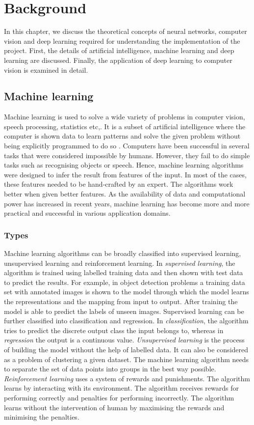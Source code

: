 \documentclass[a4paper, 12pt, oneside, BCOR1cm,toc=chapterentrywithdots]{scrbook}
\begin{document}
\chapter{Background}
 In this chapter, we discuss the theoretical concepts of neural networks, computer vision and deep learning required for understanding the implementation of the project. First, the details of artificial intelligence, machine learning and deep learning are discussed. Finally, the application of deep learning to computer vision is examined in detail. 
 
 \section{Machine learning}
 
Machine learning is used to solve a wide variety of problems in computer vision, speech processing, statistics etc,. It is a subset of artificial intelligence where the computer is shown data to learn patterns and solve the given problem without being explicitly programmed to do so \cite{awad2015efficient}. Computers have been successful in several tasks that were considered impossible by humans. However, they fail to do simple tasks such as recognising objects or speech. Hence, machine learning algorithms were designed to infer the result from features of the input. In most of the cases, these features needed to be hand-crafted by an expert. The algorithms work better when given better features. As the availability of data and computational power has increased in recent years, machine learning has become more and more practical and successful in various application domains.

\subsection{Types}
Machine learning algorithms can be broadly classified into supervised learning, unsupervised learning and reinforcement learning. In \textit{supervised learning}, the algorithm is trained using labelled training data and then shown with test data to predict the results. For example, in object detection problems a training data set with annotated images is shown to the model through which the model learns the representations and the mapping from input to output. After training the model is able to predict the labels of unseen images. Supervised learning can be further classified into classification and regression. In \textit{classification}, the algorithm tries to predict the discrete output class the input belongs to, whereas in \textit{regression} the output is a continuous value. \textit{Unsupervised learning} is the process of building the model without the help of labelled data. It can also be considered as a problem of clustering a given dataset. The machine learning algorithm needs to separate the set of data points into groups in the best way possible. \textit{Reinforcement learning} uses a system of rewards and punishments. The algorithm learns by interacting with its environment. The algorithm receives rewards for performing correctly and penalties for performing incorrectly. The algorithm learns without the intervention of human by maximising the rewards and minimising the penalties. 
\end{document}
